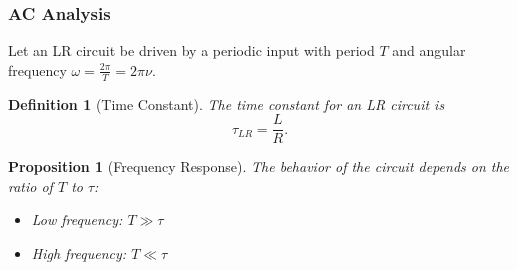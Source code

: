 \documentclass{article}
\newtheorem{definition}{Definition}
\newtheorem{proposition}{Proposition}
\begin{document}
\subsubsection{AC Analysis}
Let an LR circuit be driven by a periodic input with period $T$ and angular frequency $\omega = \frac{2\pi}{T} = 2\pi\nu$.
\begin{definition}[Time Constant]
    The time constant for an LR circuit is
    \[\tau_{LR} = \frac{L}{R}.\]
\end{definition}
\begin{proposition}[Frequency Response]
    The behavior of the circuit depends on the ratio of $T$ to $\tau$:
    \begin{itemize}
        \item Low frequency: $T \gg \tau$
        \item High frequency: $T \ll \tau$
    \end{itemize}
\end{proposition}
\end{document}
